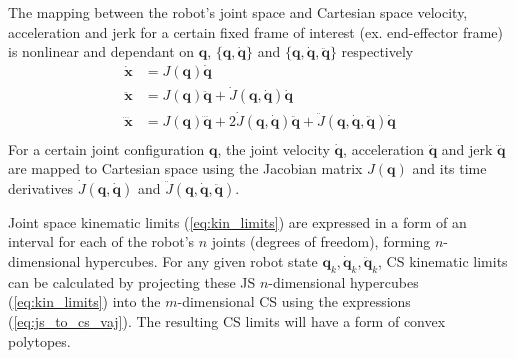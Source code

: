 The mapping between the robot's joint space and Cartesian space velocity, acceleration and jerk for a certain fixed frame of interest (ex. end-effector frame) is nonlinear and dependant on $\bm{q}$, $\{\bm{q},\dot{\bm{q}}\}$ and $\{\bm{q},\dot{\bm{q}},\ddot{\bm{q}}\}$ respectively 
\begin{equation}
\begin{split}
\dot{\bm{x}}&= J(\bm{q})\dot{\bm{q}}\\
\ddot{\bm{x}}&= J(\bm{q})\ddot{\bm{q}} + \dot{J}(\bm{q},\dot{\bm{q}})\dot{\bm{q}}\\
\dddot{\bm{x}}&= J(\bm{q})\dddot{\bm{q}} + 2\dot{J}(\bm{q},\dot{\bm{q}})\ddot{\bm{q}} + \ddot{J}(\bm{q},\dot{\bm{q}},\ddot{\bm{q}})\dot{\bm{q}}\\
 \end{split} \label{eq:js_to_cs_vaj}
\end{equation}
For a certain joint configuration $\bm{q}$, the joint velocity $\dot{\bm{q}}$, acceleration $\ddot{\bm{q}}$ and jerk $\dddot{\bm{q}}$ are mapped to Cartesian space using the Jacobian matrix $J(\bm{q})$ and its time derivatives $\dot{J}(\bm{q},\dot{\bm{q}})$ and  $\ddot{J}(\bm{q},\dot{\bm{q}},\ddot{\bm{q}})$. 

Joint space kinematic limits (\ref{eq:kin_limits}) are expressed in a form of an interval for each of the robot's $n$ joints (degrees of freedom), forming $n$-dimensional hypercubes. For any given robot state $\bm{q}_k,\dot{\bm{q}}_k,\ddot{\bm{q}}_k$, CS kinematic limits can be calculated by projecting these JS $n$-dimensional hypercubes (\ref{eq:kin_limits}) into the $m$-dimensional CS using the expressions (\ref{eq:js_to_cs_vaj}). The resulting CS limits will have a form of convex polytopes. 

